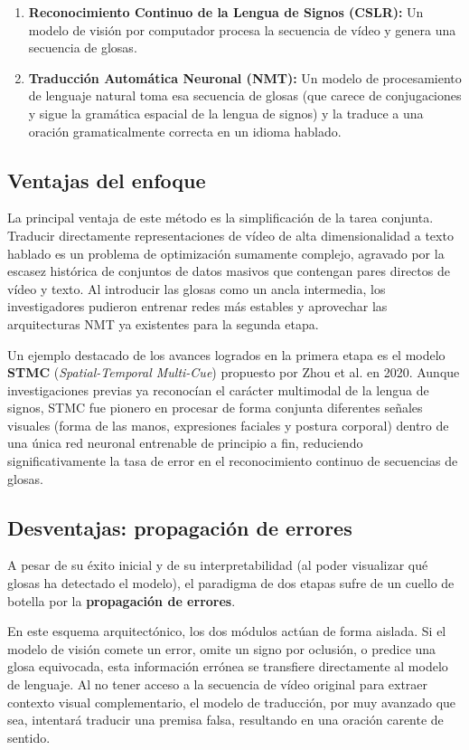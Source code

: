\begin{enumerate}
    \item \textbf{Reconocimiento Continuo de la Lengua de Signos (CSLR):} Un modelo de visión por computador procesa la secuencia de vídeo y genera una secuencia de glosas.
    \item \textbf{Traducción Automática Neuronal (NMT):} Un modelo de procesamiento de lenguaje natural toma esa secuencia de glosas (que carece de conjugaciones y sigue la gramática espacial de la lengua de signos) y la traduce a una oración gramaticalmente correcta en un idioma hablado.
\end{enumerate}

\subsection{Ventajas del enfoque}
La principal ventaja de este método es la simplificación de la tarea conjunta.
Traducir directamente representaciones de vídeo de alta dimensionalidad a texto hablado es un problema de optimización sumamente complejo, agravado por la escasez histórica de conjuntos de datos masivos que contengan pares directos de vídeo y texto.
Al introducir las glosas como un ancla intermedia, los investigadores pudieron entrenar redes más estables y aprovechar las arquitecturas NMT ya existentes para la segunda etapa.

Un ejemplo destacado de los avances logrados en la primera etapa es el modelo \textbf{STMC} (\textit{Spatial-Temporal Multi-Cue}) propuesto por Zhou et al. \cite{STMC_CSLR} en 2020.
Aunque investigaciones previas ya reconocían el carácter multimodal de la lengua de signos, STMC fue pionero en procesar de forma conjunta diferentes señales visuales (forma de las manos, expresiones faciales y postura corporal) dentro de una única red neuronal entrenable de principio a fin, reduciendo significativamente la tasa de error en el reconocimiento continuo de secuencias de glosas.



\subsection{Desventajas: propagación de errores}
A pesar de su éxito inicial y de su interpretabilidad (al poder visualizar qué glosas ha detectado el modelo), el paradigma de dos etapas sufre de un cuello de botella por la \textbf{propagación de errores}.

En este esquema arquitectónico, los dos módulos actúan de forma aislada.
Si el modelo de visión comete un error, omite un signo por oclusión, o predice una glosa equivocada, esta información errónea se transfiere directamente al modelo de lenguaje.
Al no tener acceso a la secuencia de vídeo original para extraer contexto visual complementario, el modelo de traducción, por muy avanzado que sea, intentará traducir una premisa falsa, resultando en una oración carente de sentido.

